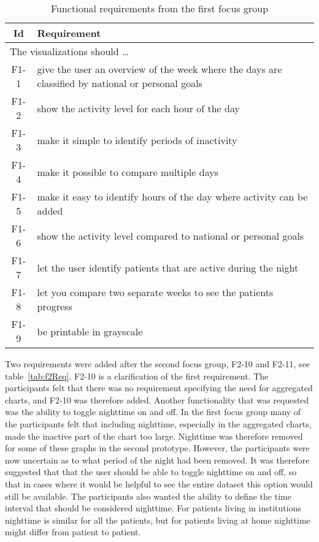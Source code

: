 \begin{table}[h!]
  \begin{center}
  \begin{tabular}{|c|p{12cm}|}
    \hline
      \textbf{Id} & \textbf{Requirement} \\ \hline
    \multicolumn{2}{|l|}{The visualizations should \ldots} \\ \hline
      F1-1 & give the user an overview of the week where the days are classified by national or personal goals \\ \hline
      F1-2 & show the activity level for each hour of the day \\ \hline
      F1-3 & make it simple to identify periods of inactivity \\ \hline
      F1-4 & make it possible to compare multiple days \\ \hline
      F1-5 & make it easy to identify hours of the day where activity can be added \\ \hline
      F1-6 & show the activity level compared to national or personal goals \\ \hline
      F1-7 & let the user identify patients that are active during the night \\ \hline
      F1-8 & let you compare two separate weeks to see the patients progress \\ \hline
      F1-9 & be printable in grayscale \\ \hline
  \end{tabular}
  \end{center}
  \caption{Functional requirements from the first focus group}
  \label{tab:f1Req}
\end{table}

Two requirements were added after the second focus group, F2-10 and F2-11, see table~\ref{tab:f2Req}. F2-10 is a clarification of the first requirement. The participants felt that there was no requirement specifying the need for aggregated charts, and F2-10 was therefore added. Another functionality that was requested was the ability to toggle nighttime on and off. In the first focus group many of the participants felt that including nighttime, especially in the aggregated charts, made the inactive part of the chart too large. Nighttime was therefore removed for some of these graphs in the second prototype. However, the participants were now uncertain as to what period of the night had been removed. It was therefore suggested that that the user should be able to toggle nighttime on and off, so that in cases where it would be helpful to see the entire dataset this option would still be available. The participants also wanted the ability to define the time interval that should be considered  nighttime. For patients living in institutions nighttime is similar for all the patients, but for patients living at home nighttime might differ from patient to patient.

